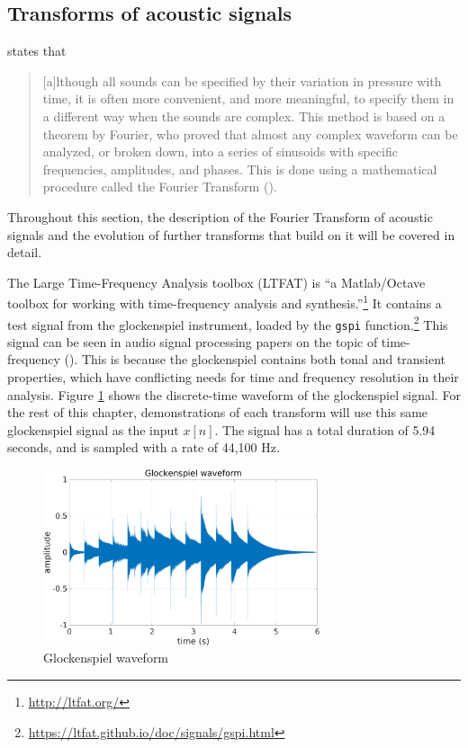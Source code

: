 \documentclass[report.tex]{subfiles}
\begin{document}
\subsection{Transforms of acoustic signals}
\label{sec:freqdomain}

\citeauthor{moore} states that

\begin{quote}
	[a]lthough all sounds can be specified by their variation in pressure with time, it is often more convenient, and more meaningful, to specify them in a different way when the sounds are complex. This method is based on a theorem by Fourier, who proved that almost any complex waveform can be analyzed, or broken down, into a series of sinusoids with specific frequencies, amplitudes, and phases. This is done using a mathematical procedure called the Fourier Transform (\cite[4]{moore}).
\end{quote}

Throughout this section, the description of the Fourier Transform of acoustic signals and the evolution of further transforms that build on it will be covered in detail.

The Large Time-Frequency Analysis toolbox (LTFAT) is ``a Matlab/Octave toolbox for working with time-frequency analysis and synthesis.''\footnote{\url{http://ltfat.org/}} It contains a test signal from the glockenspiel instrument, loaded by the \Verb#gspi# function.\footnote{\url{https://ltfat.github.io/doc/signals/gspi.html}} This signal can be seen in audio signal processing papers on the topic of time-frequency (\cite{doerflerphd, balazs, jaillet, tfjigsaw, invertiblecqt, wmdct}). This is because the glockenspiel contains both tonal and transient properties, which have conflicting needs for time and frequency resolution in their analysis. Figure \ref{fig:glockwaveform} shows the discrete-time waveform of the glockenspiel signal. For the rest of this chapter, demonstrations of each transform will use this same glockenspiel signal as the input $x[n]$. The signal has a total duration of 5.94 seconds, and is sampled with a rate of 44,100 Hz.

\begin{figure}[ht]
	\centering
	\includegraphics[width=0.725\textwidth]{./images-gspi/glock_waveform.png}
	\caption{Glockenspiel waveform}
	\label{fig:glockwaveform}
\end{figure}
\end{document}
